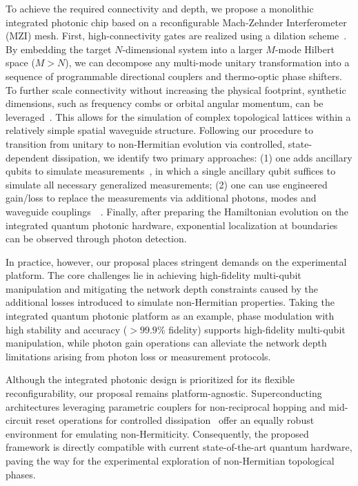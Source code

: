 \documentclass[longbibliography, aps, prx, amsmath, amssymb, amsfonts, twocolumn,superscriptaddress, footinbib]{revtex4-1}
\begin{document}
	{
	To achieve the required connectivity and depth, we propose a monolithic integrated photonic chip based on a reconfigurable Mach-Zehnder Interferometer (MZI) mesh. First, high-connectivity gates are realized using a dilation scheme~\cite{paesani2017experimental,qiang2018large,chi2022programmable}. By embedding the target $N$-dimensional system into a larger $M$-mode Hilbert space ($M > N$), we can decompose any multi-mode unitary transformation into a sequence of programmable directional couplers and thermo-optic phase shifters. To further scale connectivity without increasing the physical footprint, synthetic dimensions, such as frequency combs or orbital angular momentum, can be leveraged~\cite{wang2018multidimensional,yu2025comprehensive}. This allows for the simulation of complex topological lattices within a relatively simple spatial waveguide structure. Following our procedure to transition from unitary to non-Hermitian evolution via controlled, state-dependent dissipation, we identify two primary approaches: (1) one adds ancillary qubits to simulate measurements~\cite{hoch2025quantum}, in which a single ancillary qubit suffices to simulate all necessary generalized measurements; (2) one can use engineered gain/loss to replace the measurements via additional photons, modes and waveguide couplings~~\cite{hoch2025quantum, carolan2020variational}. Finally, after preparing the Hamiltonian evolution on the integrated quantum photonic hardware, exponential localization at boundaries can be observed through photon detection. 
	}

	{
	In practice, however, our proposal places stringent demands on the experimental platform. The core challenges lie in achieving high-fidelity multi-qubit manipulation and mitigating the network depth constraints caused by the additional losses introduced to simulate non-Hermitian properties. Taking the integrated quantum photonic platform as an example, phase modulation with high stability and accuracy ($>99.9\%$ fidelity) supports high-fidelity multi-qubit manipulation, while photon gain operations can alleviate the network depth limitations arising from photon loss or measurement protocols.
	}

	{
	Although the integrated photonic design is prioritized for its flexible reconfigurability, our proposal remains platform-agnostic. Superconducting architectures leveraging parametric couplers for non-reciprocal hopping and mid-circuit reset operations for controlled dissipation~\cite{shen2024enhanced,shen2025observation} offer an equally robust environment for emulating non-Hermiticity. Consequently, the proposed framework is directly compatible with current state-of-the-art quantum hardware, paving the way for the experimental exploration of non-Hermitian topological phases.
	}
\end{document}
